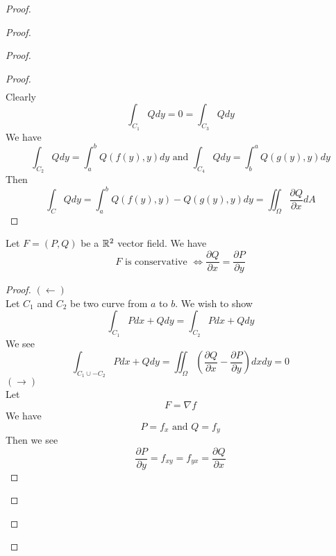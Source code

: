 \documentclass{report}
\begin{document}
\begin{proof}
\begin{proof}
\begin{proof}
\begin{proof}
\begin{align}
\end{align}
Clearly 
\begin{equation}
\int_{C_1}Qdy=0=\int_{C_3}Qdy
\end{equation}
We have
\begin{equation}
\int_{C_2} Qdy=\int_a^b Q(f(y),y)dy\text{ and }\int_{C_4}Qdy=\int_b^a Q(g(y),y)dy
\end{equation}
Then
\begin{equation}
\int_C Qdy =\int_a^b Q(f(y),y)-Q(g(y),y)dy=\iint_{\Omega} \frac{\partial Q}{\partial x}dA
\end{equation}
\end{proof}
\begin{corollary}
\label{7.3.7}
Let $F=(P,Q)$ be a  $\mathbb{R}^2$ vector field. We have
\begin{equation}
F\text{ is conservative }\iff \frac{\partial Q}{\partial x}=\frac{\partial P}{\partial y}
\end{equation}
\end{corollary}
\begin{proof}
$(\longleftarrow)$\\

Let $C_1$ and  $C_2$ be two curve from  $a$ to  $b$. We wish to show 
 \begin{equation}
\int_{C_1} Pdx+Qdy=\int_{C_2} Pdx+Qdy
\end{equation}
We see 
\begin{equation}
\int_{C_1\cup -C_2}Pdx+Qdy=\iint_{\Omega}(\frac{\partial Q}{\partial x}-\frac{\partial P}{\partial y})dxdy=0
\end{equation}
$(\longrightarrow)$\\

Let 
 \begin{equation}
F=\nabla f
\end{equation}
We have
\begin{equation}
P=f_x\text{ and }Q=f_y
\end{equation}
Then we see
\begin{equation}
\frac{\partial P}{\partial y}=f_{xy}=f_{yx}=\frac{\partial Q}{\partial x}
\end{equation}
\end{proof}


\end{proof}
\end{proof}
\end{proof}
\end{document}
